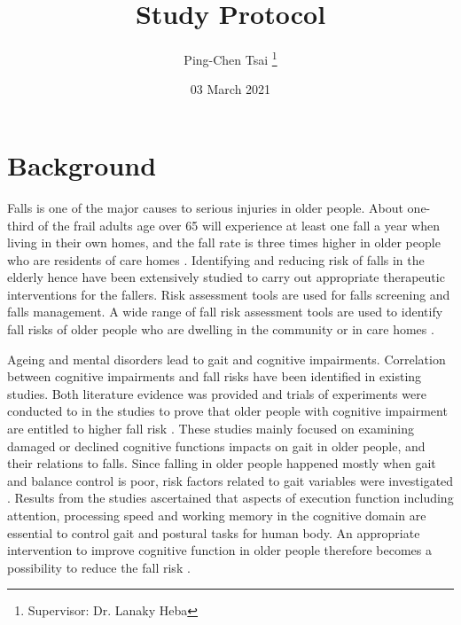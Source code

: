 \documentclass{article}
\title{Study Protocol}
\author{Ping-Chen Tsai  \thanks{Supervisor: Dr. Lanaky Heba}}
\date{03 March 2021}
\begin{document}
\maketitle

\tableofcontents
\pagebreak


\section{Background}
\begin{comment}
Aim: To place the study in the context of available evidence.
The background should be supported by appropriate references to published literature on the area of interest:
•	A thorough literature review of relevant studies and analysis, new research should build on formal review of prior evidence.
•	A brief description of the proposed study.
•	A description of the population to be studied.
•	relevant data from previous clinical trials such as efficacy, safety, tolerability

It should be written so it is easy to read and understand by someone with a basic sense of the topic who may not necessarily be an expert in the area. Some explanation of terms and concepts is likely to be beneficial. 
\end{comment}

Falls is one of the major causes to serious injuries in older people. About one-third of the frail adults age over 65 will experience at least one fall a year when living in their own homes, and the fall rate is three times higher in older people who are residents of care homes \cite{NHSFalls_2018, Robertson_2013}. Identifying and reducing risk of falls in the elderly hence have been extensively studied to carry out appropriate therapeutic interventions for the fallers. Risk assessment tools are used for falls screening and falls management. A wide range of fall risk assessment tools are used to identify fall risks of older people who are dwelling in the community \cite{PreventionofFalls2011} or in care homes \cite{Jung_2014, Kikkert_2017}. 

Ageing and mental disorders lead to gait and cognitive impairments. Correlation between cognitive impairments and fall risks have been identified in existing studies. Both literature evidence was provided and trials of experiments were conducted to in the studies to prove that older people with cognitive impairment are entitled to higher fall risk \cite{Yogev_Seligmann_2007,Martin_2012,Laurence_2017, Zhang_2019}. These studies mainly focused on examining damaged or declined cognitive functions impacts on gait in older people, and their relations to falls. Since falling in older people happened mostly when gait and balance control is poor, risk factors related to gait variables were investigated \cite{Zhang_2019, Mirelman_2012, Borowicz_2016}. Results from the studies ascertained that aspects of execution function including attention, processing speed and working memory in the cognitive domain are essential to control gait and postural tasks for human body. An appropriate intervention to improve cognitive function in older people therefore becomes a possibility to reduce the fall risk \cite{Barban_2017}. 
\end{document}
